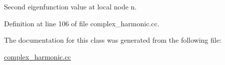 Second eigenfunction value at local node n. 



Definition at line 106 of file complex\+\_\+harmonic.\+cc.



The documentation for this class was generated from the following file\+:\begin{DoxyCompactItemize}
\item 
\hyperlink{complex__harmonic_8cc}{complex\+\_\+harmonic.\+cc}\end{DoxyCompactItemize}
